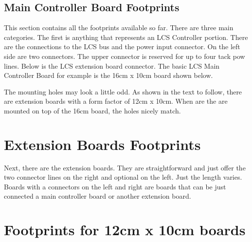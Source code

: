 \subsection{Main Controller Board Footprints}

This section contains all the footprints available so far. There are three main categories. The first is anything that represents an LCS Controller portion. There are the connections to the LCS bus and the power input connector. On the left side are two connectors. The upper connector is reserved for up to four tack pow lines. Below is the LCS extension board connector. The basic LCS Main Controller Board for example is the 16cm x 10cm board shown below.

\begin{figure}[ht]
    \centering
\end{figure}

\FloatBarrier

The mounting holes may look a little odd. As shown in the text to follow, there are extension boards with a form factor of 12cm x 10cm. When are the are mounted on top of the 16cm board, the holes nicely match. 

\section{Extension Boards Footprints}

Next, there are the extension boards. They are straightforward and just offer the two connector lines on the right and optional on the left. Just the length varies. Boards with a connectors on the left and right are boards that can be just connected a main controller board or another extension board.  

\begin{figure}[ht]
    \centering
\end{figure}

\FloatBarrier

\begin{figure}[ht]
    \centering
\end{figure}

\FloatBarrier

\section{Footprints for 12cm x 10cm boards}

